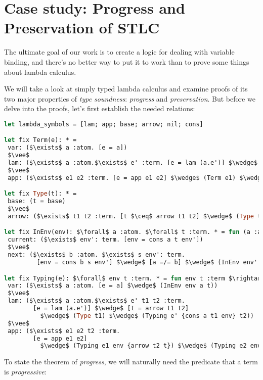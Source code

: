 \documentclass[english, mgr]{iithesis}
\renewcommand{\it}[1]{\textit{#1}}
\begin{document}
\chapter{Case study: Progress and Preservation of STLC}

The ultimate goal of our work is to create a logic for dealing with variable binding,
and there's no better way to put it to work than to prove some things about lambda calculus.

We will take a look at simply typed lambda calculus and examine proofs of
its two major properties of \it{type soundness}: \it{progress} and \it{preservation}.
But before we delve into the proofs, let's first establish the needed relations:
\begin{lstlisting}[mathescape,language=OCaml]
let lambda_symbols = [lam; app; base; arrow; nil; cons]

let fix Term(e): * =
 var: ($\exists$ a :atom. [e = a])
 $\vee$
 lam: ($\exists$ a :atom.$\exists$ e' :term. [e = lam (a.e')] $\wedge$ (Term e'))
 $\vee$
 app: ($\exists$ e1 e2 :term. [e = app e1 e2] $\wedge$ (Term e1) $\wedge$ (Term e2))

let fix Type(t): * =
 base: (t = base)
 $\vee$
 arrow: ($\exists$ t1 t2 :term. [t $\ceq$ arrow t1 t2] $\wedge$ (Type t1) $\wedge$ (Type t2))

let fix InEnv(env): $\forall$ a :atom. $\forall$ t :term. * = fun (a :atom) (t :term) $\rightarrow$
 current: ($\exists$ env': term. [env = cons a t env'])
 $\vee$
 next: ($\exists$ b :atom. $\exists$ s env': term.
         [env = cons b s env'] $\wedge$ [a =/= b] $\wedge$ (InEnv env' a t))

let fix Typing(e): $\forall$ env t :term. * = fun env t :term $\rightarrow$
 var: ($\exists$ a :atom. [e = a] $\wedge$ (InEnv env a t))
 $\vee$
 lam: ($\exists$ a :atom.$\exists$ e' t1 t2 :term.
        [e = lam (a.e')] $\wedge$ [t = arrow t1 t2]
          $\wedge$ (Type t1) $\wedge$ (Typing e' {cons a t1 env} t2))
 $\vee$
 app: ($\exists$ e1 e2 t2 :term.
        [e = app e1 e2]
          $\wedge$ (Typing e1 env {arrow t2 t}) $\wedge$ (Typing e2 env t2))
\end{lstlisting}
To state the theorem of \it{progress}, we will naturally need the predicate
that a term is \it{progressive}:
\end{document}

